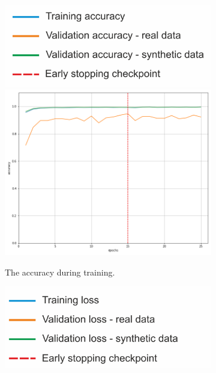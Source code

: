 \begin{figure}[!h]
\centering
    \begin{subfigure}[t]{.45\textwidth}
        \centering
        \includegraphics[width=.7\textwidth]{images/popisAc.png}
        \includegraphics[width=\textwidth]{images/accuracy13r_0.png}
        \caption{The accuracy during training.}
        \label{fig:accm11}
    \end{subfigure}
    \begin{subfigure}[t]{.45\textwidth}
        \centering
        \includegraphics[width=.7\textwidth]{images/popisLoss.png}

\end{subfigure}
\end{figure}
